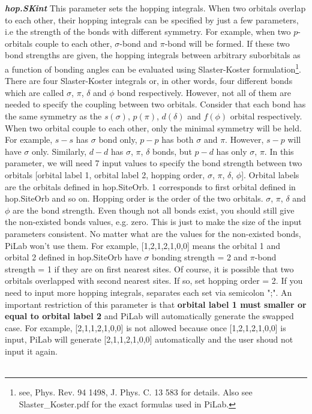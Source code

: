 \documentclass[10pt,a4paper]{article}
\begin{document}
\textit{\textbf{hop.SKint}} This parameter sets the hopping integrals. When two orbitals overlap to  each other, their hopping integrals can be specified by just a few parameters, i.e the strength of the bonds with different symmetry. For example, when two $p$-orbitals couple to each other, $\sigma$-bond and $\pi$-bond will be formed. If these two bond strengths are given, the hopping integrals between arbitrary suborbitals as a function of bonding angles can be evaluated using Slaster-Koster formulation\footnote{see, Phys. Rev. 94 1498, J. Phys. C. 13 583 for details. Also see Slaster\_Koster.pdf for the exact formulas used in PiLab.}. There are four Slaster-Koster integrals or, in other words, four different bonds which are called $\sigma$, $\pi$, $\delta$ and $\phi$ bond respectively. However, not all of them are needed to specify the coupling between two orbitals. Consider that each bond has the same symmetry as the $s (\sigma)$, $p (\pi)$, $d (\delta)$ and $f (\phi)$ orbital respectively. When two orbital couple to each other, only the minimal symmetry will be held. For example, $s-s$ has $\sigma$ bond only, $p-p$ has both $\sigma$ and $\pi$. However, $s-p$ will have $\sigma$ only. Similarly, $d-d$ has $\sigma$, $\pi$, $\delta$ bonds, but $p-d$ has only $\sigma$, $\pi$. In this parameter, we will need 7 input values to specify the bond strength between two orbitals [orbital label 1, orbital label 2, hopping order, $\sigma$, $\pi$, $\delta$, $\phi$]. Orbital labels are the orbitals defined in hop.SiteOrb. 1 corresponds to first orbital defined in hop.SiteOrb and so on. Hopping order is the order of the two orbitals. $\sigma$, $\pi$, $\delta$ and $\phi$ are the bond strength. Even though not all bonds exist, you should still give the non-existed bonds values, e.g. zero. This is just to make the size of the input parameters consistent. No matter what are the values for the non-existed bonds, PiLab won't use them. For example, [1,2,1,2,1,0,0] means the orbital 1 and orbital 2 defined in hop.SiteOrb have $\sigma$ bonding strength = 2 and $\pi$-bond strength = 1 if they are on first nearest sites. Of course, it is possible that two orbitals overlapped with second nearest sites. If so, set hopping order = 2. If you need to input more hopping integrals, separates each set via semicolon ";". An important restriction of this parameter is that \textbf{orbital label 1 must smaller or equal to orbital label 2} and PiLab will automatically generate the swapped case. For example, [2,1,1,2,1,0,0] is not allowed because once [1,2,1,2,1,0,0] is input, PiLab will generate [2,1,1,2,1,0,0] automatically and the user shoud not input it again.  \\ \\
\end{document}
